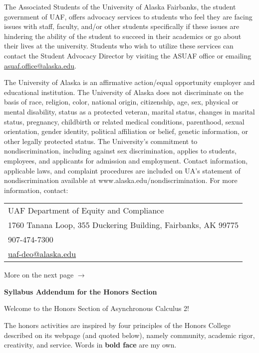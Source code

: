 \documentclass[12pt]{article}
\def\mailto#1{\href{mailto:#1}{#1}}
\begin{document}
The Associated Students of the University of Alaska Fairbanks, the student government of UAF, offers advocacy services to students who feel they are facing issues with staff, faculty, and/or other students specifically if these issues are hindering the ability of the student to succeed in their academics or go about their lives at the university. Students who wish to utilize these services can contact the Student Advocacy Director by visiting the ASUAF office or emailing \mailto{asuaf.office@alaska.edu}.

The University of Alaska is an affirmative action/equal opportunity employer and educational institution. The University of Alaska does not discriminate on the basis of race, religion, color, national origin, citizenship, age, sex, physical or mental disability, status as a protected veteran, marital status, changes in marital status, pregnancy, childbirth or related medical conditions, parenthood, sexual orientation, gender identity, political affiliation or belief, genetic information, or other legally protected status. The University's commitment to nondiscrimination, including against sex discrimination, applies to students, employees, and applicants for admission and employment. Contact information, applicable laws, and complaint procedures are included on UA's statement of nondiscrimination available at www.alaska.edu/nondiscrimination. For more information, contact:

\begin{tabular}{l}
UAF Department of Equity and Compliance\\
1760 Tanana Loop, 355 Duckering Building, Fairbanks, AK  99775\\
907-474-7300\\
\mailto{uaf-deo@alaska.edu}
\end{tabular}

\vfill

{\Large{More on the next page $\longrightarrow$}}


\newpage
\begin{center}
\textbf{\large{Syllabus Addendum for the Honors Section}}
\end{center}

Welcome to the Honors Section of Asynchronous Calculus 2!

The honors activities are inspired by four principles of the Honors College described on its webpage (and quoted below), namely community, academic rigor, creativity, and service. Words in \textbf{bold face} are my own.
\end{document}
